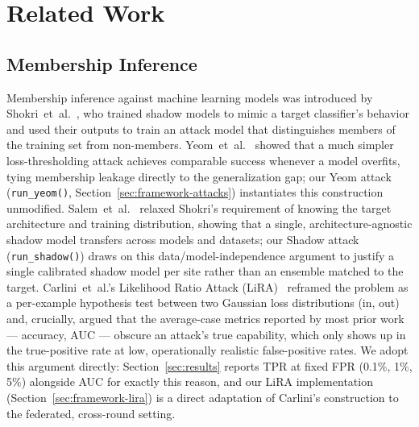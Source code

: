 
\section{Related Work}
\subsection{Membership Inference}
\label{sec:related-mia}

Membership inference against machine learning models was introduced by
Shokri~et~al.~\cite{shokri2017membership}, who trained shadow models to
mimic a target classifier's behavior and used their outputs to train an
attack model that distinguishes members of the training set from
non-members. Yeom~et~al.~\cite{yeom2018privacy} showed that a much
simpler loss-thresholding attack achieves comparable success whenever a
model overfits, tying membership leakage directly to the
generalization gap; our Yeom attack (\texttt{run\_yeom()},
Section~\ref{sec:framework-attacks}) instantiates this construction
unmodified. Salem~et~al.~\cite{salem2019mlleaks} relaxed Shokri's
requirement of knowing the target architecture and training
distribution, showing that a single, architecture-agnostic shadow
model transfers across models and datasets; our Shadow attack
(\texttt{run\_shadow()}) draws on this data/model-independence
argument to justify a single calibrated shadow model per site rather
than an ensemble matched to the target. Carlini~et~al.'s Likelihood
Ratio Attack (LiRA)~\cite{carlini2022membership} reframed the problem
as a per-example hypothesis test between two Gaussian loss
distributions (in, out) and, crucially, argued that the
average-case metrics reported by most prior work --- accuracy, AUC ---
obscure an attack's true capability, which only shows up in the
true-positive rate at low, operationally realistic false-positive
rates. We adopt this argument directly: Section~\ref{sec:results}
reports TPR at fixed FPR (0.1\%, 1\%, 5\%) alongside AUC for exactly
this reason, and our LiRA implementation
(Section~\ref{sec:framework-lira}) is a direct adaptation of Carlini's
construction to the federated, cross-round setting.

